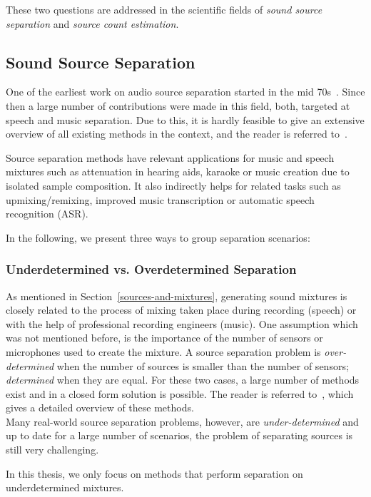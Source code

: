 These two questions are addressed in the scientific fields of \emph{sound source separation} and \emph{source count estimation}.

\subsection{Sound Source Separation}

One of the earliest work on audio source separation started in the mid 70s~\cite{miller73}.
Since then a large number of contributions were made in this field, both, targeted at speech and music separation.
Due to this, it is hardly feasible to give an extensive overview of all existing methods in the context, and the reader is referred to~\cite{vincent18, comon10, rafii}.
\par
Source separation methods have relevant applications for music and speech mixtures such as attenuation in hearing aids, karaoke or music creation due to isolated sample composition.
It also indirectly helps for related tasks such as upmixing/remixing, improved music transcription or automatic speech recognition (ASR). 
\par
In the following, we present three ways to group separation scenarios:

\subsubsection*{Underdetermined vs. Overdetermined Separation}
As mentioned in Section~\ref{sources-and-mixtures}, generating sound mixtures is closely related to the process of mixing taken place during recording (speech) or with the help of professional recording engineers (music).
One assumption which was not mentioned before, is the importance of the number of sensors or microphones used to create the mixture.
A source separation problem is \emph{over-determined} when the number of sources is smaller than the number of sensors; \emph{determined} when they are equal.
For these two cases, a large number of methods exist and in a closed form solution is possible.
The reader is referred to~\cite{common10}, which gives a detailed overview of these methods.\\
Many real-world source separation problems, however, are \emph{under-determined} and up to date for a large number of scenarios, the problem of separating sources is still very challenging.
\par
In this thesis, we only focus on methods that perform separation on underdetermined mixtures.

